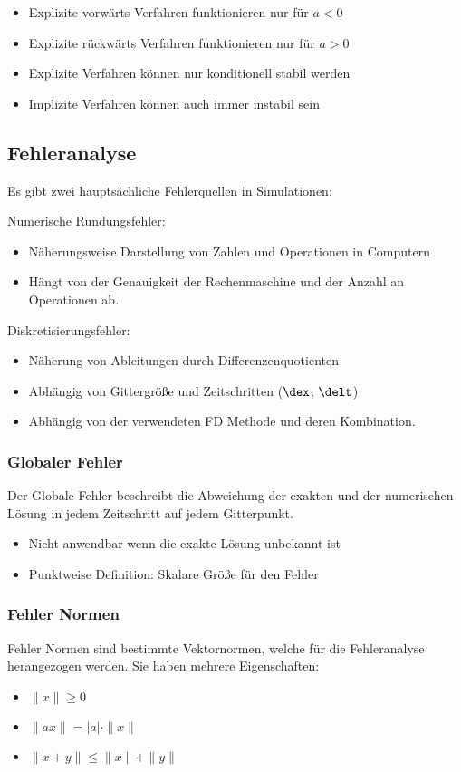 \begin{itemize}
	\item Explizite vorw\"arts Verfahren funktionieren nur f\"ur $a<0$
	\item Explizite r\"uckw\"arts Verfahren funktionieren nur f\"ur $a>0$
	\item Explizite Verfahren k\"onnen nur konditionell stabil werden
	\item Implizite Verfahren k\"onnen auch immer instabil sein
\end{itemize}

\subsection{Fehleranalyse}
Es gibt zwei haupts\"achliche Fehlerquellen in Simulationen:
\begin{multicols}{2}
Numerische Rundungsfehler:
\begin{itemize}
	\item N\"aherungsweise Darstellung von Zahlen und Operationen in Computern
	\item H\"angt von der Genauigkeit der Rechenmaschine und der Anzahl an Operationen ab.
\end{itemize}
\columnbreak
Diskretisierungsfehler:
\begin{itemize}
	\item N\"aherung von Ableitungen durch Differenzenquotienten
	\item Abh\"angig von Gittergr\"o\ss{}e und Zeitschritten ($\dex$, $\delt$)
	\item Abh\"angig von der verwendeten FD Methode und deren Kombination.
\end{itemize}
\end{multicols}

\subsubsection{Globaler Fehler}
Der Globale Fehler beschreibt die Abweichung der exakten und der numerischen L\"osung in jedem Zeitschritt auf jedem Gitterpunkt.
\begin{itemize}
	\item Nicht anwendbar wenn die exakte L\"osung unbekannt ist
	\item Punktweise Definition: Skalare Gr\"o\ss{}e f\"ur den Fehler
\end{itemize}

\subsubsection{Fehler Normen}
Fehler Normen sind bestimmte Vektornormen, welche f\"ur die Fehleranalyse herangezogen werden. Sie haben mehrere Eigenschaften:
\begin{itemize}
	\item $\|x\| \geq 0$
	\item $\|ax\| = |a|\cdot\|x\|$
	\item $\|x + y\| \leq \|x\| + \|y\|$
\end{itemize}

